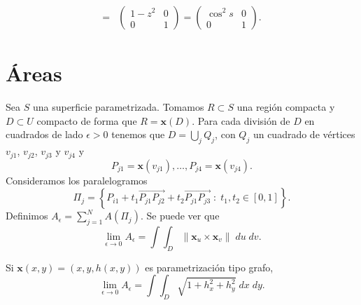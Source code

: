 \begin{eg}[Esfera]
\[\begin{split}
	= & \begin{pmatrix} 1-z^{2} & 0 \\ 0 & 1 \end{pmatrix}=\begin{pmatrix} \cos ^{2}s & 0 \\ 0 & 1 \end{pmatrix}.
\end{split}
\]
\end{eg}

\section{Áreas}
Sea $\displaystyle S $ una superficie parametrizada. Tomamos $\displaystyle R \subset S $ una región compacta y $\displaystyle D \subset U $ compacto de forma que $\displaystyle R = \textbf{x} \left(D\right) $. Para cada división de $\displaystyle D $ en cuadrados de lado $\displaystyle \epsilon > 0 $ tenemos que $\displaystyle D = \bigcup_{j}Q_{j} $, con $\displaystyle Q_{j} $ un cuadrado de vértices $\displaystyle v_{j1} $, $\displaystyle v_{j2} $, $\displaystyle v_{j3} $ y $\displaystyle v_{j4} $ y 
\[P_{j1} = \textbf{x} \left(v_{j1}\right), \ldots, P_{j4}= \textbf{x} \left(v_{j4}\right) .\]
 Consideramos los paralelogramos
\[\Pi_{j} = \left\{ P_{i1} + t_{1} \overrightarrow{P_{j1}P_{j2}} + t_{2}\overrightarrow{P_{j1}P_{j3}}\; : \; t_{1}, t_{2} \in \left[0,1\right] \right\} .\]
Definimos $\displaystyle A_{\epsilon }=\sum^{N}_{j = 1}A\left(\Pi_{j}\right) $. Se puede ver que 
\[\lim_{\epsilon  \to 0}A_{\epsilon }=\int \int _{D}\| \textbf{x} _{u} \times \textbf{x} _{v}\| \; du \; dv .\]
\begin{eg}
Si $\displaystyle \textbf{x} \left(x,y\right)=\left(x,y,h\left(x,y\right)\right) $ es parametrización tipo grafo, 
\[\lim_{\epsilon  \to 0}A_{\epsilon }=\int \int _{D}\sqrt{1 + h_{x}^{2} + h_{y}^{2}} \; dx \; dy .\]
\end{eg}

